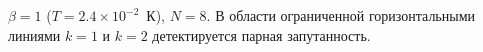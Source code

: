 $\beta = 1$ ($T = 2.4\times 10^{-2}$~К), $N=8$.
В области ограниченной горизонтальными линиями $k=1$ и $k=2$
детектируется парная запутанность.

